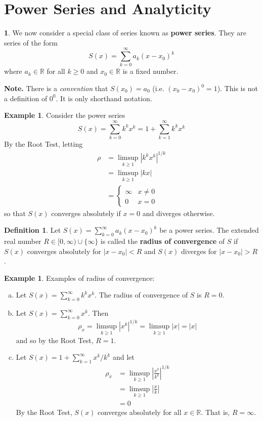 \documentclass[11pt]{article}
\theoremstyle{definition}
\newtheorem{defn}[thm]{Definition}
\newtheorem{exmp}[thm]{Example}
\newtheorem{none}[thm]{}
\newcommand{\mbR}{\ensuremath{\mathbb{R}}}
\begin{document}
\newpage

\section{Power Series and Analyticity}

\begin{none}
We now consider a special class of series known as \textbf{power series}. They are series of the form
$$S(x) = \sum_{k=0}^\infty a_k (x - x_0)^k$$
where $a_k \in \mbR$ for all $k \geq 0$ and $x_0 \in \mbR$ is a fixed number.
\end{none}

\textbf{Note.} There is a \textit{convention} that $S(x_0) = a_0$ (i.e. $(x_0 - x_0)^0 = 1$). This is not a definition of $0^0$. It is only shorthand notation.

\begin{exmp}
Consider the power series
$$S(x) = \sum_{k=0}^\infty k^k x^k = 1 + \sum_{k=1}^\infty k^k x^k$$
By the Root Test, letting
\begin{align*}
\rho & = \limsup_{k\geq1} |k^k x^k|^{1/k} \\
& = \limsup_{k\geq1} |kx| \\
& = \begin{cases} \infty & x \ne 0 \\ 0 & x = 0 \end{cases}
\end{align*}
so that $S(x)$ converges absolutely if $x = 0$ and diverges otherwise.
\end{exmp}

\begin{defn}
Let $S(x) = \sum_{k=0}^\infty a_k(x-x_0)^k$ be a power series. The extended real number $R \in [0, \infty) \cup \{\infty\}$ is called the \textbf{radius of convergence} of $S$ if $S(x)$ converges absolutely for $|x - x_0| < R$ and $S(x)$ diverges for $|x - x_0| > R$.
\end{defn}

\begin{exmp}
Examples of radius of convergence:
\begin{enumerate}[(a)]
\item Let $S(x) = \sum_{k=0}^\infty k^k x^k$. The radius of convergence of $S$ is $R = 0$.
\item Let $S(x) = \sum_{k=0}^\infty x^k$. Then
$$\rho_x = \limsup_{k\geq1} |x^k|^{1/k} = \limsup_{k\geq1} |x| = |x|$$
and so by the Root Test, $R = 1$.
\item Let $S(x) = 1 + \sum_{k=1}^\infty x^k / k^k$ and let
\begin{align*}
\rho_x & = \limsup_{k\geq1} \left| \frac{x^k}{k^k} \right|^{1/k} \\
& = \limsup_{k\geq1} \left|\frac{x}{k}\right| \\
& = 0
\end{align*}
By the Root Test, $S(x)$ converges absolutely for all $x \in \mbR$. That is, $R = \infty$.
\end{enumerate}
\end{exmp}
\end{document}
